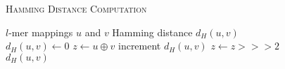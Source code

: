 \begin{figure}[h]
	\noindent \hspace*{6pt}{\bf Algorithm 3} \textsc{Hamming Distance Computation}
	\begin{algorithmic}[1]
		\label{alg:hamming-distance-comp}
		\Require $l$-mer mappings $u$ and $v$
		\Ensure Hamming distance $d_H(u,v)$ \vspace*{6pt}
		\State $d_H(u, v) \leftarrow 0$
		\State $z \leftarrow u \oplus v$
				\State increment $d_H(u, v)$
			\EndIf
			\State $z \leftarrow z >>> 2$ 
		\EndFor
		\State\Return $d_H(u, v)$
	\end{algorithmic}
\end{figure}